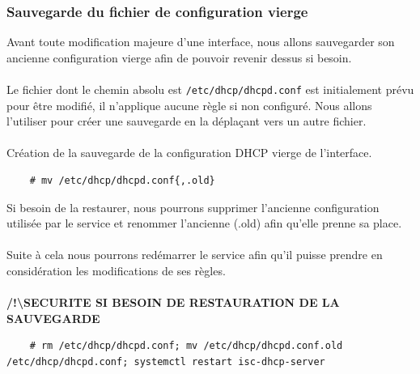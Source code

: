 \documentclass[a4paper]{article}
\begin{document}
\subsubsection{Sauvegarde du fichier de configuration vierge}
Avant toute modification majeure d'une interface, nous allons sauvegarder son ancienne configuration vierge afin de pouvoir revenir dessus si besoin.\\\\Le fichier dont le chemin absolu est \verb|/etc/dhcp/dhcpd.conf| est initialement prévu pour être modifié, il n'applique aucune règle si non configuré. Nous allons l'utiliser pour créer une sauvegarde en la déplaçant vers un autre fichier.\\\\Création de la sauvegarde de la configuration DHCP vierge de l'interface.
\begin{lstlisting}
    # mv /etc/dhcp/dhcpd.conf{,.old}
\end{lstlisting}
Si besoin de la restaurer, nous pourrons supprimer l'ancienne configuration utilisée par le service et renommer l'ancienne (.old) afin qu'elle prenne sa place.\\\\Suite à cela nous pourrons redémarrer le service afin qu'il puisse prendre en considération les modifications de ses règles.\\\\
\textbf{/!\textbackslash SECURITE SI BESOIN DE RESTAURATION DE LA SAUVEGARDE}
\begin{lstlisting}
    # rm /etc/dhcp/dhcpd.conf; mv /etc/dhcp/dhcpd.conf.old /etc/dhcp/dhcpd.conf; systemctl restart isc-dhcp-server
\end{lstlisting}
\end{document}
